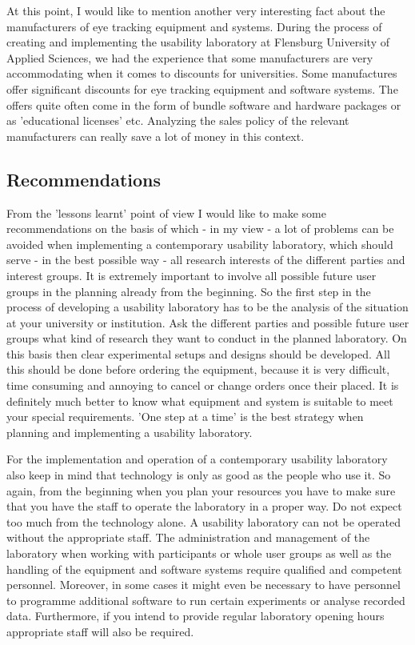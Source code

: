 \documentclass[output=paper]{langsci/langscibook}
\begin{document}
At this point, I would like to mention another very interesting fact about the manufacturers of eye tracking equipment and systems. During the process of creating and implementing the usability laboratory at Flensburg University of Applied Sciences, we had the experience that some manufacturers are very accommodating when it comes to discounts for universities. Some manufactures offer significant discounts for eye tracking equipment and software systems. The offers quite often come in the form of bundle software and hardware packages or as 'educational licenses' etc. Analyzing the sales policy of the relevant manufacturers can really save a lot of money in this context.


\subsection{Recommendations}

From the 'lessons learnt' point of view I would like to make some recommendations on the basis of which - in my view - a lot of problems can be avoided when implementing a contemporary usability laboratory, which should serve - in the best possible way - all research interests of the different parties and interest groups. It is extremely important to involve all possible future user groups in the planning already from the beginning. So the first step in the process of developing a usability laboratory has to be the analysis of the situation at your university or institution. Ask the different parties and possible future user groups what kind of research they want to conduct in the planned laboratory. On this basis then clear experimental setups and designs should be developed. All this should be done before ordering the equipment, because it is very difficult, time consuming and annoying to cancel or change orders once their placed. It is definitely much better to know what equipment and system is suitable to meet your special requirements. 'One step at a time' is the best strategy when planning and implementing a usability laboratory.


For the implementation and operation of a contemporary usability laboratory also keep in mind that technology is only as good as the people who use it. So again, from the beginning when you plan your resources you have to make sure that you have the staff to operate the laboratory in a proper way. Do not expect too much from the technology alone. A usability laboratory can not be operated without the appropriate staff. The administration and management of the laboratory when working with participants or whole user groups as well as the handling of the equipment and software systems require qualified and competent personnel. Moreover, in some cases it might even be necessary to have personnel to programme additional software to run certain experiments or analyse recorded data. Furthermore, if you intend to provide regular laboratory opening hours appropriate staff will also be required. 
\end{document}
